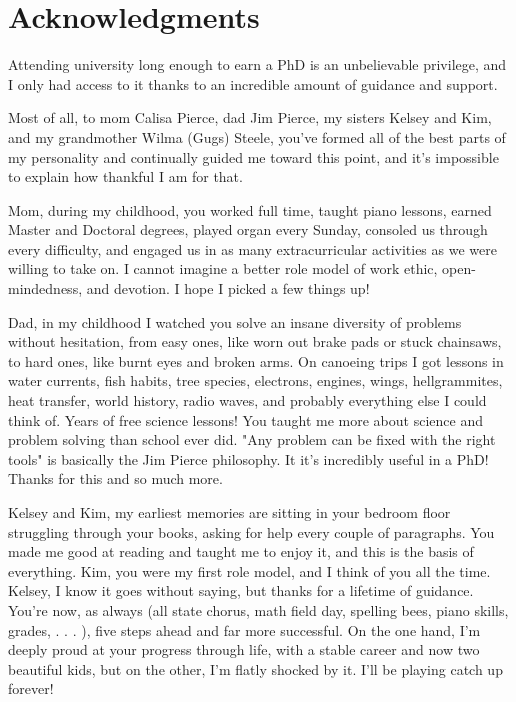 
\chapter{Acknowledgments}

Attending university long enough to earn a PhD is an unbelievable privilege, and I only had access to it thanks to an incredible amount of guidance and support.

Most of all, to mom Calisa Pierce, dad Jim Pierce, my sisters Kelsey and Kim, and my grandmother Wilma (Gugs) Steele, you've formed all of the best parts of my personality and continually guided me toward this point, and it's impossible to explain how thankful I am for that.

Mom, during my childhood, you worked full time, taught piano lessons, earned Master and Doctoral degrees, played organ every Sunday, consoled us through every difficulty, and engaged us in as many extracurricular activities as we were willing to take on.
I cannot imagine a better role model of work ethic, open-mindedness, and devotion. I hope I picked a few things up!

Dad, in my childhood I watched you solve an insane diversity of problems without hesitation, from easy ones, like worn out brake pads or stuck chainsaws, to hard ones, like burnt eyes and broken arms.
On canoeing trips I got lessons in water currents, fish habits, tree species, electrons, engines, wings, hellgrammites, heat transfer, world history, radio waves, and probably everything else I could think of. Years of free science lessons! You taught me more about science and problem solving than school ever did. "Any problem can be fixed with the right tools" is basically the Jim Pierce philosophy. It it's incredibly useful in a PhD! Thanks for this and so much more.

Kelsey and Kim, my earliest memories are sitting in your bedroom floor struggling through your books, asking for help every couple of paragraphs. You made me good at reading and taught me to enjoy it, and this is the basis of everything. Kim, you were my first role model, and I think of you all the time. Kelsey, I know it goes without saying, but thanks for a lifetime of guidance. You're now, as always (all state chorus, math field day, spelling bees, piano skills, grades, . . . ), five steps ahead and far more successful. On the one hand, I'm deeply proud at your progress through life, with a stable career and now two beautiful kids, but on the other, I'm flatly shocked by it.
I'll be playing catch up forever!

